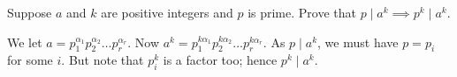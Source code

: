 \begin{problem}
	Suppose $a$ and $k$ are positive integers and $p$ is prime.
	Prove that $p \mid a^k \implies p^k \mid a^k$.
\end{problem}

\begin{solution}
	We let $a = p_1^{\alpha_1} p_2^{\alpha_2} \ldots p_r^{\alpha_r}$.
	Now $a^k = p_1^{k\alpha_1} p_2^{k\alpha_2} \ldots p_r^{k\alpha_r}$.
	As $p \mid a^k$, we must have $p = p_i$ for some $i$.
	But note that $p_i^k$ is a factor too; hence
	$p^k \mid a^k$.
\end{solution}
